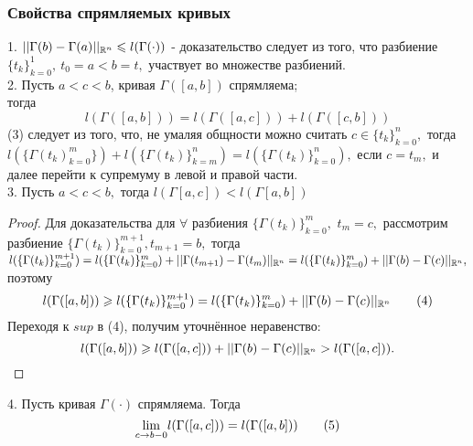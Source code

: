 \documentclass[main]{subfiles}
\begin{document}
 \subsubsection{Свойства спрямляемых кривых}
 1. $|| \Gamma(b)-\Gamma(a)||_{\mathbb{R}^n}\leqslant l(\Gamma(\cdot))$ - доказательство следует из того, что разбиение $\{ t_k\}^1_{k=0},\ t_0=a<b=t,$ участвует во множестве разбиений.\\
 2. Пусть $a<c<b$, кривая $\Gamma([a,b])$ спрямляема; \\
  тогда \[l(\Gamma([a,b]))=l(\Gamma([a,c]))+l(\Gamma([c,b]))\tag{3}\]
  (3) следует из того, что, не умаляя общности можно считать $c\in \{t_k\}^n_{k=0},$ тогда\\ \( l(\{\Gamma(t_k)^m_{k=0}\})+l(\{\Gamma(t_k)\}^n_{k=m})=l(\{\Gamma(t_k)\}^n_{k=0}), \) если $c=t_m,$ и далее перейти к супремуму в левой и правой части.\\
3. Пусть $a<c<b,$ тогда $l(\Gamma[a,c])<l(\Gamma[a,b])$
 \begin{proof}
Для доказательства для $\forall$ разбиения $\{\Gamma(t_k)\}_{k=0}^m,$ $t_m=c,$ рассмотрим разбиение $\{ \Gamma(t_k)\}^{m+1}_{k=0}, t_{m+1}=b,$ тогда\\
 $l(\{\Gamma(t_k)\}^{m+1}_{k=0})=l(\{\Gamma(t_k)\}^m_{k=0})+||\Gamma(t_{m+1})-
 \Gamma(t_m)||_{{\mathbb{R}^n}}=l(\{\Gamma(t_k)\}^m_{k=0})+||\Gamma(b)-\Gamma(c)||_{\mathbb{R}^n},$ поэтому 
 \[l(\Gamma([a,b]))\geqslant l(\{\Gamma(t_k)\}_{k=0}^{m+1})= l(\{\Gamma(t_k)\}_{k=0}^m)+||\Gamma(b)-\Gamma(c)||_{{\mathbb{R}^n}} \tag{4} \]
 Переходя к $sup$ в (4), получим уточнённое неравенство:
\[ l(\Gamma([a,b]))\geqslant l(\Gamma([a,c]))+||\Gamma(b)-\Gamma(c)||_{\mathbb{R}^n}>l(\Gamma([a,c])). \]
 \end{proof}
4. Пусть кривая $\Gamma(\cdot)$ спрямляема. Тогда \[ \underset{c\to b-0}{\lim} l(\Gamma([a,c]))=l(\Gamma([a,b]))\tag{5} \]
\end{document}
